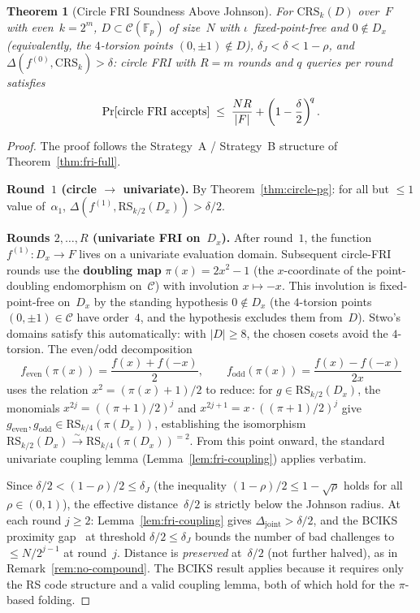 \documentclass[11pt]{article}
\newtheorem{theorem}{Theorem}
\newcommand{\FF}{\mathbb{F}}
\newcommand{\RS}{\mathrm{RS}}
\begin{document}
\begin{theorem}[Circle FRI Soundness Above Johnson]
\label{thm:fri-circle}
For $\mathrm{CRS}_k(D)$ over~$F$ with even~$k = 2^m$, $D \subset \mathcal{C}(\FF_p)$ of size~$N$ with $\iota$~fixed-point-free and $0 \notin D_x$ (equivalently, the $4$-torsion points $(0, \pm 1) \notin D$), $\delta_J < \delta < 1{-}\rho$, and $\Delta(f^{(0)}, \mathrm{CRS}_k) > \delta$: circle FRI with $R = m$ rounds and $q$ queries per round satisfies
$$\Pr[\textup{circle FRI accepts}] \;\leq\; \frac{NR}{|F|} + \left(1 - \frac{\delta}{2}\right)^{\!q}.$$
\end{theorem}

\begin{proof}
The proof follows the Strategy~A / Strategy~B structure of Theorem~\ref{thm:fri-full}.

\textbf{Round~$1$ (circle $\to$ univariate).} By Theorem~\ref{thm:circle-pg}: for all but $\leq 1$ value of~$\alpha_1$, $\Delta(f^{(1)}, \RS_{k/2}(D_x)) > \delta/2$.

\textbf{Rounds $2, \ldots, R$ (univariate FRI on~$D_x$).} After round~$1$, the function $f^{(1)}: D_x \to F$ lives on a univariate evaluation domain. Subsequent circle-FRI rounds use the \textbf{doubling map} $\pi(x) = 2x^2 - 1$ (the $x$-coordinate of the point-doubling endomorphism on~$\mathcal{C}$) with involution $x \mapsto -x$. This involution is fixed-point-free on~$D_x$ by the standing hypothesis $0 \notin D_x$ (the $4$-torsion points $(0, \pm 1) \in \mathcal{C}$ have order~$4$, and the hypothesis excludes them from~$D$). Stwo's domains satisfy this automatically: with $|D| \geq 8$, the chosen cosets avoid the $4$-torsion. The even/odd decomposition
$$f_{\mathrm{even}}(\pi(x)) = \frac{f(x) + f(-x)}{2}, \qquad f_{\mathrm{odd}}(\pi(x)) = \frac{f(x) - f(-x)}{2x}$$
uses the relation $x^2 = (\pi(x)+1)/2$ to reduce: for $g \in \RS_{k/2}(D_x)$, the monomials $x^{2j} = ((\pi+1)/2)^j$ and $x^{2j+1} = x \cdot ((\pi+1)/2)^j$ give $g_{\mathrm{even}}, g_{\mathrm{odd}} \in \RS_{k/4}(\pi(D_x))$, establishing the isomorphism $\RS_{k/2}(D_x) \xrightarrow{\sim} \RS_{k/4}(\pi(D_x))^{=2}$. From this point onward, the standard univariate coupling lemma (Lemma~\ref{lem:fri-coupling}) applies verbatim.

Since $\delta/2 < (1{-}\rho)/2 \leq \delta_J$ (the inequality $(1{-}\rho)/2 \leq 1{-}\sqrt{\rho}$ holds for all $\rho \in (0,1)$), the effective distance~$\delta/2$ is strictly below the Johnson radius. At each round $j \geq 2$: Lemma~\ref{lem:fri-coupling} gives $\Delta_{\mathrm{joint}} > \delta/2$, and the BCIKS proximity gap~\cite{BCIKS} at threshold $\delta/2 \leq \delta_J$ bounds the number of bad challenges to $\leq N/2^{j-1}$ at round~$j$. Distance is \emph{preserved} at~$\delta/2$ (not further halved), as in Remark~\ref{rem:no-compound}. The BCIKS result applies because it requires only the RS code structure and a valid coupling lemma, both of which hold for the $\pi$-based folding.


\end{proof}
\end{document}
